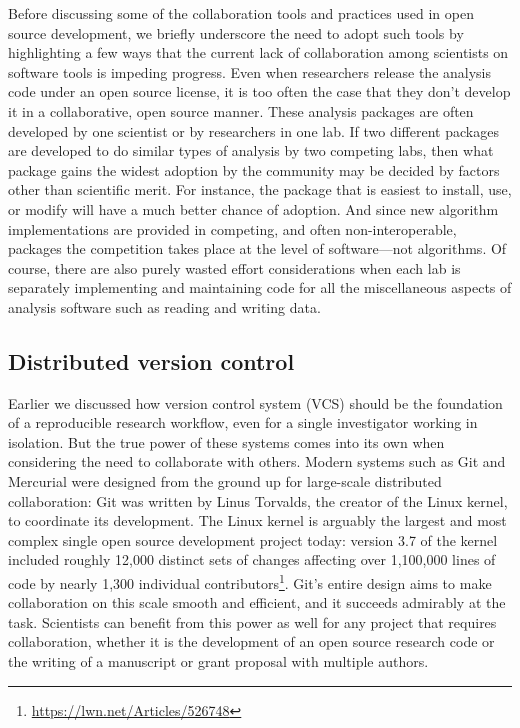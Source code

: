 \documentclass[ChapterTOCs,krantz2]{krantz} %
\begin{document}
Before discussing some of the collaboration tools and practices used in open
source development, we briefly underscore the need to adopt such tools
by highlighting a few ways that the current lack of collaboration among
scientists on software tools is impeding progress. Even when researchers
release the analysis code under an open source license, it is too often the
case that they don't develop it in a collaborative, open source manner.
These analysis packages are often developed by one scientist or by researchers
in one lab. If two different packages are developed to do similar types
of analysis by two competing labs, then what package gains the widest adoption
by the community may be decided by factors other than scientific merit. For
instance, the package that is easiest to install, use, or modify will have
a much better chance of adoption. And since new algorithm implementations
are provided in competing, and often non-interoperable, packages the
competition takes place at the level of software---not algorithms. Of course,
there are also purely wasted effort considerations when each lab is separately
implementing and maintaining code for all the miscellaneous aspects of
analysis software such as reading and writing data.

\subsection{Distributed version control}

Earlier we discussed how version control system (VCS) should be the foundation of a
reproducible research workflow, even for a single investigator working in
isolation.  But the true power of these systems comes into its own when
considering the need to collaborate with others.  Modern systems such as Git
and Mercurial were designed from the ground up for large-scale distributed
collaboration: Git was written by Linus Torvalds, the creator of the Linux
kernel, to coordinate its development.  The Linux kernel is arguably the
largest and most complex single open source development project today: version
3.7 of the kernel included roughly 12,000 distinct sets of changes affecting
over 1,100,000 lines of code by nearly 1,300 individual
contributors\footnote{\url{https://lwn.net/Articles/526748}}.  Git's entire
design aims to make collaboration on this scale smooth and efficient, and it
succeeds admirably at the task.  Scientists can benefit from this power as well
for any project that requires collaboration, whether it is the development of
an open source research code or the writing of a manuscript or grant proposal
with multiple authors.
\end{document}
